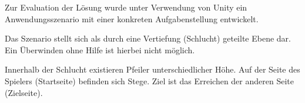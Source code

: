 \documentclass[25pt, a0paper, portrait, margin=0mm, innermargin=15mm,blockverticalspace=15mm, colspace=15mm, subcolspace=8mm, ngerman]{tikzposter}
\begin{document}
\begin{columns}
\begin{subcolumns}
{\begin{itemize}
            \end{itemize}
            
            \vspace{1em}
            
	        
            \vspace{-2cm}
        }
        
        {
            Zur Evaluation der Lösung wurde unter Verwendung von Unity ein Anwendungsszenario mit einer konkreten Aufgabenstellung entwickelt.
            
            \vspace{1em}
            
            Das Szenario stellt sich als durch eine Vertiefung (Schlucht) geteilte Ebene dar. Ein Überwinden ohne Hilfe ist hierbei nicht möglich.
            
            \vspace{1em}
            
            Innerhalb der Schlucht existieren Pfeiler unterschiedlicher Höhe. Auf der Seite des Spielers (Startseite) befinden sich Stege. Ziel ist das Erreichen der anderen Seite (Zielseite).
            
            \vspace{1em}
            
}
\end{subcolumns}
\end{columns}
\end{document}
